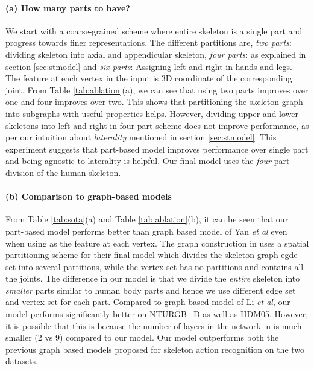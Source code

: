 \documentclass{bmvc2k}
\def\etal{\emph{et al}\bmvaOneDot}
\begin{document}
\paragraph{(a) How many parts to have?} We start with a coarse-grained scheme where entire skeleton is a single part and progress towards finer representations. The different partitions are, \textit{two parts}: dividing skeleton into axial and appendicular skeleton, \textit{four parts}: as explained in section \ref{sec:stmodel} and \textit{six parts}: Assigning left and right in hands and legs. The feature at each vertex in the input is 3D coordinate of the corresponding joint. From Table \ref{tab:ablation}(a), we can see that using two parts improves over one and four improves over two. This shows that partitioning the skeleton graph into subgraphs with useful properties helps. However, dividing upper and lower skeletons into left and right in four part scheme does not improve performance, as per our intuition about \textit{laterality} mentioned in section \ref{sec:stmodel}. This experiment suggests that part-based model improves performance over single part and being agnostic to laterality is helpful. Our final model uses the \textit{four} part division of the human skeleton.

\paragraph{(b) Comparison to graph-based models} From Table \ref{tab:sota}(a) and Table \ref{tab:ablation}(b), it can be seen that our part-based model performs better than graph based model of Yan \etal \cite{yan2018spatial} even when using  as the feature at each vertex. The graph construction in \cite{yan2018spatial} uses a spatial partitioning scheme for their final model which divides the skeleton graph egde set into several partitions, while the vertex set has no partitions and contains all the joints. The difference in our model is that we divide the \textit{entire} skeleton into \textit{smaller} parts similar to human body parts and hence we use different edge set and vertex set for each part. Compared to graph based model of Li \etal \cite{li2018spatio}, our model performs significantly better on NTURGB+D as well as HDM05. However, it is possible that this is because the number of layers in the network in \cite{li2018spatio} is much smaller (2 vs 9) compared to our model. Our model outperforms both the previous graph based models proposed for skeleton action recognition on the two datasets.
\end{document}
